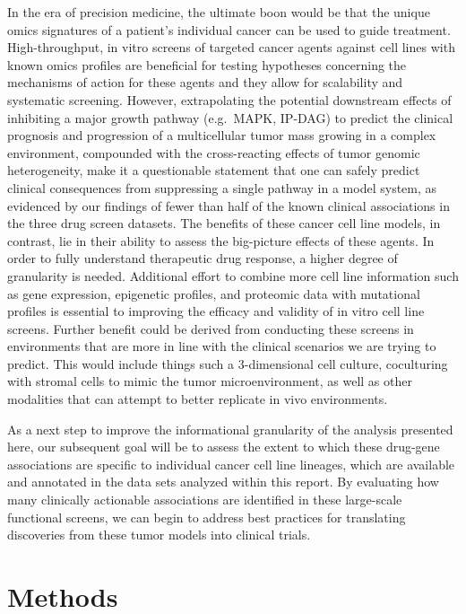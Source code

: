 \documentclass[man]{apa6}
\begin{document}
In the era of precision medicine, the ultimate boon would be that the
unique omics signatures of a patient's individual cancer can be used to
guide treatment. High-throughput, in vitro screens of targeted cancer
agents against cell lines with known omics profiles are beneficial for
testing hypotheses concerning the mechanisms of action for these agents
and they allow for scalability and systematic screening. However,
extrapolating the potential downstream effects of inhibiting a major
growth pathway (e.g.~MAPK, IP-DAG) to predict the clinical prognosis and
progression of a multicellular tumor mass growing in a complex
environment, compounded with the cross-reacting effects of tumor genomic
heterogeneity, make it a questionable statement that one can safely
predict clinical consequences from suppressing a single pathway in a
model system, as evidenced by our findings of fewer than half of the
known clinical associations in the three drug screen datasets. The
benefits of these cancer cell line models, in contrast, lie in their
ability to assess the big-picture effects of these agents. In order to
fully understand therapeutic drug response, a higher degree of
granularity is needed. Additional effort to combine more cell line
information such as gene expression, epigenetic profiles, and proteomic
data with mutational profiles is essential to improving the efficacy and
validity of in vitro cell line screens. Further benefit could be derived
from conducting these screens in environments that are more in line with
the clinical scenarios we are trying to predict. This would include
things such a 3-dimensional cell culture, coculturing with stromal cells
to mimic the tumor microenvironment, as well as other modalities that
can attempt to better replicate in vivo environments.

As a next step to improve the informational granularity of the analysis
presented here, our subsequent goal will be to assess the extent to
which these drug-gene associations are specific to individual cancer
cell line lineages, which are available and annotated in the data sets
analyzed within this report. By evaluating how many clinically
actionable associations are identified in these large-scale functional
screens, we can begin to address best practices for translating
discoveries from these tumor models into clinical trials.

\newpage

\section{Methods}\label{methods}
\end{document}
